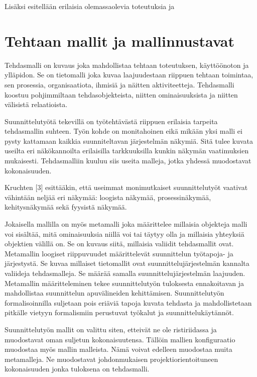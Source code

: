 \documentclass[finnish,12pt]{article}
\begin{document}
Lisäksi esitellään erilaisia olemassaolevia toteutuksia ja 


	\clearpage
	\section{Tehtaan mallit ja mallinnustavat}

Tehdasmalli on kuvaus joka mahdollistaa tehtaan toteutuksen, käyttöönoton ja ylläpidon. Se on tietomalli joka kuvaa laajuudestaan riippuen tehtaan toimintaa, sen prosessia, organisaatiota, ihmisiä ja näitten aktiviteetteja. Tehdasmalli koostuu pohjimmiltaan tehdasobjekteista, niitten ominaisuuksista ja niitten välisistä relaatioista.

Suunnittelutyötä tekevillä on työtehtävästä riippuen erilaisia tarpeita tehdasmallin suhteen. Työn kohde on monitahoinen eikä mikään yksi malli ei pysty kattamaan kaikkia suunniteltavan järjestelmän näkymiä. Sitä tulee kuvata useilta eri näkökannoilta erilaisilla tarkkuuksilla kunkin näkymän vaatimuksien mukaisesti. Tehdasmalliin kuuluu siis useita malleja, jotka yhdessä muodostavat kokonaisuuden.

Kruchten [3] esittääkin, että useimmat monimutkaiset suunnittelutyöt vaativat vähintään neljää eri näkymää: loogista näkymää, prosessinäkymää, kehitysnäkymää sekä fyysistä näkymää.

Jokaisella mallilla on myös metamalli joka määrittelee millaisia objekteja malli voi sisältää, mitä ominaisuuksia niillä voi tai täytyy olla ja millaisia yhteyksiä objektien välillä on. Se on kuvaus siitä, millaisia valiidit tehdasmallit ovat. Metamallin loogiset riippuvuudet määrittelevät suunnittelun työtapoja- ja järjestystä.  Se kuvaa millaiset tietomallit ovat suunnittelujärjestelmän kannalta valiideja tehdasmalleja. Se määrää samalla suunnittelujärjestelmän laajuuden. Metamallin määritteleminen tekee suunnittelutyön tuloksesta ennakoitavan ja mahdollistaa suunnittelun apuvälineiden kehittämisen. Suunnittelutyön formalisoinnilla suljetaan pois eriäviä tapoja kuvata tehdasta ja mahdollistetaan pitkälle vietyyn formalismiin perustuvat työkalut ja suunnittelukäytännöt.

Suunnittelutyön mallit on valittu siten, etteivät ne ole ristiriidassa ja muodostavat oman suljetun kokonaisuutensa. Tällöin mallien konfiguraatio muodostaa myös mallin malleista. Nämä voivat edelleen muodostaa muita metamalleja. Ne muodostavat johdonmukaisen projektiorientoituneen kokonaisuuden jonka tuloksena on tehdasmalli.
\end{document}

